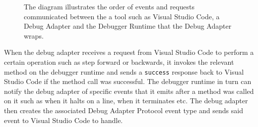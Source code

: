 \documentclass[12pt,pdftex,titlepage]{report}
\begin{document}
            \begin{figure}[htb!]
                \centering
                \caption{The diagram illustrates the order of events and requests communicated between the a tool such as Visual Studio Code, a Debug Adapter and the Debugger Runtime that the Debug Adapter wraps.}
                \label{fig:dapflow}
            \end{figure}
            
            When the debug adapter receives a request from Visual Studio Code to perform a certain operation such as step forward or backwards, it invokes the relevant method on the debugger runtime and sends a \texttt{success} response back
            to Visual Studio Code if the method call was successful. The debugger runtime in turn can notify the debug adapter of specific events that it emits after a method was called on it such as when it halts on a line, when it terminates 
            etc. The debug adapter then creates the associated Debug Adapter Protocol event type and sends said event to Visual Studio Code to handle.
\end{document}
